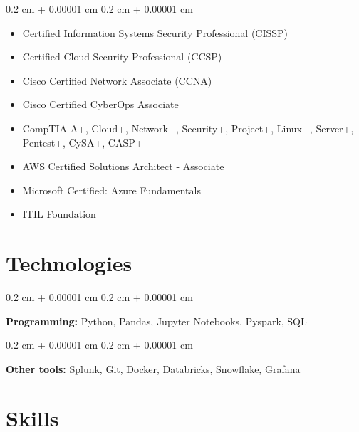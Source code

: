 \documentclass[10pt, letterpaper]{article}
\newenvironment{highlightsforbulletentries}{
    \begin{itemize}[
        topsep=0.10 cm,
        parsep=0.10 cm,
        partopsep=0pt,
        itemsep=0pt,
        leftmargin=10pt
    ]
}{
    \end{itemize}
} %
\newenvironment{onecolentry}{
    \begin{adjustwidth}{
        0.2 cm + 0.00001 cm
    }{
        0.2 cm + 0.00001 cm
    }
}{
    \end{adjustwidth}
} %
\begin{document}
    \begin{onecolentry}
        \begin{highlightsforbulletentries}


        \item Certified Information Systems Security Professional (CISSP)

        \item Certified Cloud Security Professional (CCSP)

        \item Cisco Certified Network Associate (CCNA)

        \item Cisco Certified CyberOps Associate

        \item CompTIA A+, Cloud+, Network+, Security+, Project+, Linux+, Server+, Pentest+, CySA+, CASP+

        \item AWS Certified Solutions Architect - Associate

        \item Microsoft Certified: Azure Fundamentals

        \item ITIL Foundation


        \end{highlightsforbulletentries}
    \end{onecolentry}

    \section{Technologies}



        
        \begin{onecolentry}
            \textbf{Programming:} Python, Pandas, Jupyter Notebooks, Pyspark, SQL
        \end{onecolentry}

        \vspace{0.2 cm}

        \begin{onecolentry}
            \textbf{Other tools:} Splunk, Git, Docker, Databricks, Snowflake, Grafana
        \end{onecolentry}


    
    \section{Skills}
\end{document}
